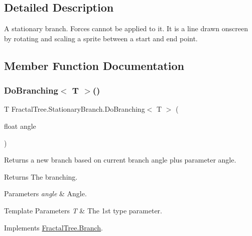 \subsection{Detailed Description}
A stationary branch. Forces cannot be applied to it. It is a line drawn onscreen by rotating and scaling a sprite between a start and end point. 



\subsection{Member Function Documentation}
\mbox{\label{class_fractal_tree_1_1_stationary_branch_a57ff42d0c4793c0c40aa1671905bf222}} 
\subsubsection{\texorpdfstring{Do\+Branching$<$ T $>$()}{DoBranching< T >()}}
{\footnotesize\ttfamily T Fractal\+Tree.\+Stationary\+Branch.\+Do\+Branching$<$ T $>$ (\begin{DoxyParamCaption}\item[{float}]{angle }\end{DoxyParamCaption})}



Returns a new branch based on current branch angle plus parameter angle. 

\begin{DoxyReturn}{Returns}
The branching.
\end{DoxyReturn}

\begin{DoxyParams}{Parameters}
{\em angle} & Angle.\\
\hline
\end{DoxyParams}

\begin{DoxyTemplParams}{Template Parameters}
{\em T} & The 1st type parameter.\\
\hline
\end{DoxyTemplParams}


Implements \hyperlink{interface_fractal_tree_1_1_branch_ad3240d5e5d13df2ee22e55892f9c03cd}{Fractal\+Tree.\+Branch}.

